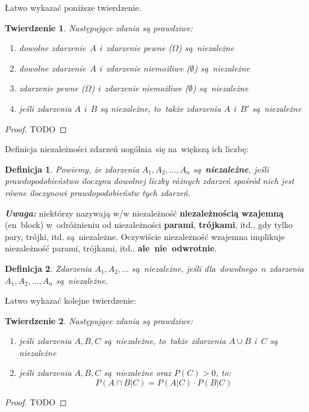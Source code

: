 \documentclass[10pt,a4paper]{article}
\newtheorem{definition}{Definicja}[section]
\newtheorem{theorem}{Twierdzenie}[section]
\newcommand{\Warning}{\marginpar{\dbend}\textbf{\textit{Uwaga: }}}
\begin{document}
Łatwo wykazać poniższe twierdzenie.
\begin{theorem}
  Następujące zdania są prawdziwe:
  \begin{enumerate}
    \item[1$^\circ$] dowolne zdarzenie~$A$ i~zdarzenie pewne ($\Omega$)
      są~niezależne
    \item[2$^\circ$] dowolne zdarzenie~$A$ i~zdarzenie niemożliwe ($\emptyset$)
      są~niezależne
    \item[3$^\circ$] zdarzenie pewne ($\Omega$) i~zdarzenie niemożliwe
      ($\emptyset$) są~niezależne
    \item[4$^\circ$] jeśli zdarzenia $A$ i~$B$ są niezależne, to~także zdarzenia
      $A$ i~$B'$ są~niezależne
  \end{enumerate}
\end{theorem}
\begin{proof}
  TODO
\end{proof}

Definicja niezależności zdarzeń uogólnia~się na~większą ich liczbę:
\begin{definition}
  Powiemy, że zdarzenia $A_1,A_2,...,A_n$ są~\textbf{niezależne}, jeśli
  prawdopodobieństwo iloczynu dowolnej liczby różnych zdarzeń spośród nich jest
  równe iloczynowi prawdopodobieństw tych zdarzeń.
\end{definition}

\Warning niektórzy nazywają w/w niezależność \textbf{niezależnością wzajemną}
(en~block) w~odróżnieniu od niezależności \textbf{parami}, \textbf{trójkami},
itd., gdy tylko pary, trójki, itd. są~niezależne. Oczywiście niezależność
wzajemna implikuje niezależność parami, trójkami, itd.,
\textbf{ale~nie~odwrotnie}.

\begin{definition}
  Zdarzenia $A_1,A_2,\dotsc$ są~niezależne, jeśli dla~dowolnego~$n$
  zdarzenia~$A_1,A_2,\dotsc,A_n$ są~niezależne.
\end{definition}

Łatwo wykazać kolejne twierdzenie:

\begin{theorem}
  Następujące zdania są prawdziwe:
  \begin{enumerate}
    \item jeśli zdarzenia $A,B,C$ są~niezależne, to~także zdarzenia $A\cup B$
      i~$C$ są niezależne
    \item jeśli zdarzenia $A,B,C$ są~niezależne oraz $P(C)>0$, to:
      \begin{equation}
        P(A\cap B|C)=P(A|C)\cdot P(B|C)
      \end{equation}
  \end{enumerate}
\end{theorem}
\begin{proof}
  TODO
\end{proof}
\end{document}
